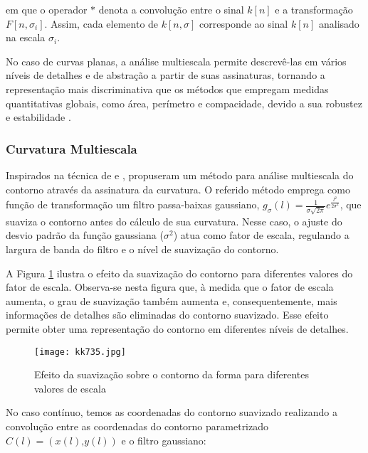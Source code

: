 \noindent
 em que o operador $*$ denota a convolução entre o sinal $k[n]$ e a transformação $F[n,\sigma_i]$.  Assim, cada elemento de $k[n,\sigma]$ corresponde ao sinal $k[n]$ analisado na escala $\sigma_i$.

No caso de curvas planas, a análise multiescala permite descrevê-las em vários níveis de detalhes e de abstração a partir de suas assinaturas, tornando a representação mais discriminativa que os métodos que empregam medidas quantitativas globais, como área, perímetro e compacidade, devido a sua robustez e estabilidade \cite{4756134}.    

\subsubsection*{Curvatura Multiescala\label{subsec:curvMS}}

Inspirados na técnica de  e ,  propuseram um método para análise multiescala do contorno através da assinatura da curvatura. O referido método emprega como função de transformação um filtro passa-baixas gaussiano, $g_{\sigma}(l) = \frac{1}{\sigma\sqrt{2\pi}}e^{\frac{l^2}{2\sigma^2}}$, que suaviza o contorno antes do cálculo de sua curvatura. Nesse caso, o ajuste do desvio padrão da função gaussiana ($\sigma^2$) atua como fator de escala, regulando a largura de banda do filtro e o nível de suavização do contorno.

A Figura \ref{fig:kk_cont} ilustra o efeito da suavização do contorno para diferentes valores do fator de escala. Observa-se nesta figura que, à medida que o fator de escala aumenta, o grau de suavização também aumenta e, consequentemente, mais informações de detalhes são eliminadas do contorno suavizado. Esse efeito permite obter uma representação do contorno em diferentes níveis de detalhes.

\begin{figure}[h!]
  \caption{\label{fig:kk_cont} Efeito da suavização sobre o contorno da forma para diferentes valores de escala }
  \centering
  \texttt{[image: kk735.jpg]}
 \end{figure}



No caso contínuo, temos as coordenadas do contorno suavizado realizando a convolução entre as coordenadas do contorno parametrizado $C(l) = (x(l)\text{,}y(l))$ e o filtro gaussiano:  

